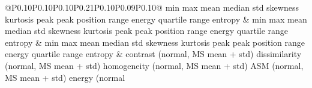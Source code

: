 \begin{table}
\begin{tabular}{@{}P{0.10\linewidth}P{0.10\linewidth}P{0.10\linewidth}P{0.21\linewidth}P{0.10\linewidth}P{0.09\linewidth}P{0.10\linewidth}@{}}
		min \newline max \newline mean \newline median \newline std \newline skewness \newline kurtosis \newline peak \newline peak position \newline range \newline energy \newline quartile range \newline entropy & min \newline max \newline mean \newline median \newline std \newline skewness \newline kurtosis \newline peak \newline peak position \newline range \newline energy \newline quartile range \newline entropy & min \newline max \newline mean \newline median \newline std \newline skewness \newline kurtosis \newline peak \newline peak position \newline range \newline energy \newline quartile range \newline entropy & contrast (normal, MS mean + std) \newline dissimilarity (normal, MS mean + std) \newline homogeneity (normal, MS mean + std) \newline ASM (normal, MS mean + std) \newline energy (normal
\end{tabular}
\end{table}
